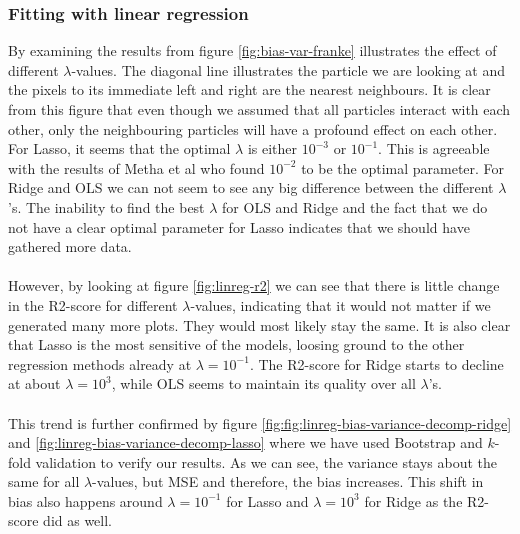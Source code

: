 \subsubsection{Fitting with linear regression}
By examining the results from figure \ref{fig:bias-var-franke} illustrates the effect of different $\lambda$-values. The diagonal line illustrates the particle we are looking at and the pixels to its immediate left and right are the nearest neighbours. It is clear from this figure that even though we assumed that all particles interact with each other, only the neighbouring particles will have a profound effect on each other. For Lasso, it seems that the optimal $\lambda$ is either $10^{-3}$ or $10^{-1}$. This is agreeable with the results of Metha et al \cite{2018arXiv180308823M} who found $10^{-2}$ to be the optimal parameter. For Ridge and OLS we can not seem to see any big difference between the different $\lambda$'s. The inability to find the best $\lambda$ for OLS and Ridge and the fact that we do not have a clear optimal parameter for Lasso indicates that we should have gathered more data. \\ \\
However, by looking at figure \ref{fig:linreg-r2} we can see that there is little change in the R2-score for different $\lambda$-values, indicating that it would not matter if we generated many more plots. They would most likely stay the same. It is also clear that Lasso is the most sensitive of the models, loosing ground to the other regression methods already at $\lambda = 10^{-1}$. The R2-score for Ridge starts to decline at about $\lambda = 10^{3}$, while OLS seems to maintain its quality over all $\lambda$'s. \\ \\
This trend is further confirmed by figure \ref{fig:fig:linreg-bias-variance-decomp-ridge} and \ref{fig:linreg-bias-variance-decomp-lasso} where we have used Bootstrap and $k$-fold validation to verify our results. As we can see, the variance stays about the same for all $\lambda$-values, but MSE and therefore, the bias increases. This shift in bias also happens around $\lambda = 10^{-1}$ for Lasso and $\lambda = 10^{3}$ for Ridge as the R2-score did as well.
